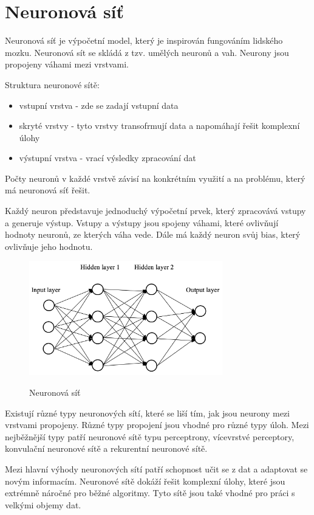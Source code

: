 \section{Neuronová síť}
Neuronová síť je výpočetní model, který je inspirován fungováním lidského mozku.
Neuronová sít se skládá z tzv. umělých neuronů a vah.
Neurony jsou propojeny váhami mezi vrstvami.

Struktura neuronové sítě:
\begin{itemize}
    \item vstupní vrstva - zde se zadají vstupní data
    \item skryté vrstvy - tyto vrstvy transofrmují data a napomáhají řešit komplexní úlohy
    \item výstupní vrstva - vrací výsledky zpracování dat
\end{itemize}

Počty neuronů v každé vrstvě závisí na konkrétním využití a na problému, který má neuronová síť řešit.

Každý neuron představuje jednoduchý výpočetní prvek, který zpracovává vstupy a generuje výstup.
Vstupy a výstupy jsou spojeny váhami, které ovlivňují hodnoty neuronů, ze kterých váha vede.
Dále má každý neuron svůj bias, který ovlivňuje jeho hodnotu.

\begin{figure}[h]
    \centering
    \includegraphics[width=0.75\textwidth]{images/network.png}
    \caption{Neuronová síť}\cite{sit}
\end{figure}

Existují různé typy neuronových sítí, které se liší tím, jak jsou neurony mezi vrstvami propojeny.
Různé typy propojení jsou vhodné pro různé typy úloh.
Mezi nejběžnější typy patří neuronové sítě typu perceptrony, vícevrstvé perceptory, konvulační neuronové sítě a rekurentní neuronové sítě.

Mezi hlavní výhody neuronových sítí patří schopnost učit se z dat a adaptovat se novým informacím.
Neuronové sítě dokáží řešit komplexní úlohy, které jsou extrémně náročné pro běžné algoritmy.
Tyto sítě jsou také vhodné pro práci s velkými objemy dat.

